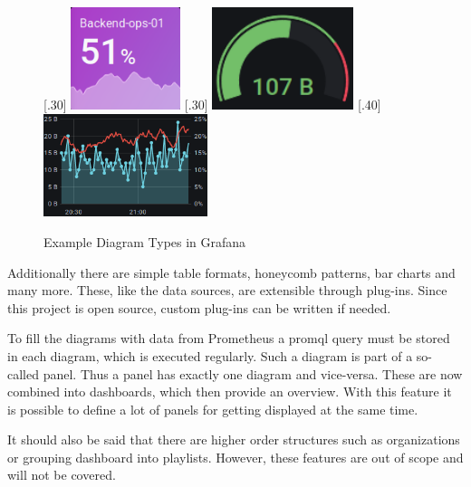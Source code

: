 \begin{figure}[!ht]
	[.30\textwidth]{%
		\centering
		\includegraphics[height=3cm]{assets/screenshots/Screenshot_2020-12-08 1 - New Features in v7 0 - Grafana.png}
	}%
	[.30\textwidth]{%
		\centering
		\includegraphics[height=3cm]{assets/screenshots/Screenshot_2020-12-08 Website trends - Grafana.png}
	}%
	[.40\textwidth]{%
		\centering
		\includegraphics[height=3cm]{assets/screenshots/Screenshot_2020-12-08 Grafana Play Home - Grafana(2).png}
	}%
	\caption{Example Diagram Types in Grafana}
	\label{fig:example_grafana_graph}
\end{figure}

Additionally there are simple table formats, honeycomb patterns, bar charts and many more. These, like the data sources, are extensible through plug-ins. Since this project is open source, custom plug-ins can be written if needed.

To fill the diagrams with data from Prometheus a \gls{promql} query must be stored in each diagram, which is executed regularly. Such a diagram is part of a so-called panel. Thus a panel has exactly one diagram and vice-versa. These are now combined into dashboards, which then provide an overview. With this feature it is possible to define a lot of panels for getting displayed at the same time.

It should also be said that there are higher order structures such as organizations or grouping dashboard into playlists. However, these features are out of scope and will not be covered.

